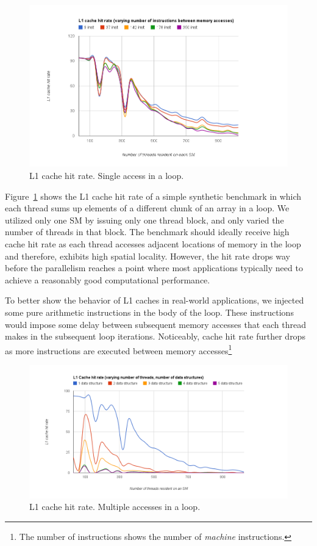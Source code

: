 \begin{figure}[t]
\includegraphics[scale=0.35]{l1SingleAccess.png}
\caption{L1 cache hit rate. Single access in a loop.}
\label{fig:l1single}
\end{figure}


Figure~\ref{fig:l1single} shows the L1 cache hit rate of a simple synthetic benchmark in which each
thread sums up elements of a different chunk of an array in a loop. We utilized only one SM by
issuing only one thread block, and only varied the number of threads in that block. The benchmark
should ideally receive high cache hit rate as each thread accesses adjacent locations of memory in
the loop and therefore, exhibits high spatial locality. However, the hit rate drops way before the
parallelism reaches a point where most applications typically need to achieve a reasonably good
computational performance.

To better show the behavior of L1 caches in real-world applications, we injected some pure
arithmetic instructions in the body of the loop. These instructions would impose some delay between
subsequent memory accesses that each thread makes in the subsequent loop iterations. Noticeably,
cache hit rate further drops as more instructions are executed between memory accesses\footnote{The
number of instructions shows the number of {\it machine} instructions.}


\begin{figure}[t]
\includegraphics[scale=0.25]{l1MultipleAccess.png}
\caption{L1 cache hit rate. Multiple accesses in a loop.}
\label{fig:l1multiple}
\end{figure}


